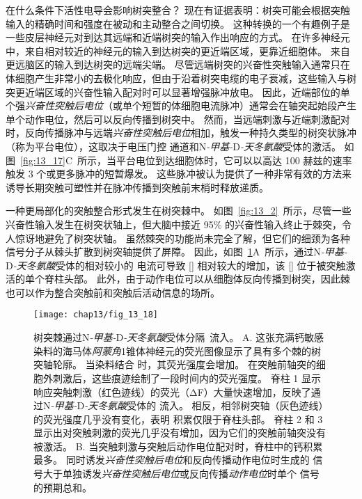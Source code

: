 在什么条件下活性电导会影响树突整合？
现在有证据表明：树突可能会根据突触输入的精确时间和强度在被动和主动整合之间切换。
这种转换的一个有趣例子是一些皮层神经元对到达其远端和近端树突的输入作出响应的方式。
在许多神经元中，来自相对较近的神经元的输入到达树突的更近端区域，更靠近细胞体。
来自更远脑区的输入到达树突的远端尖端。
尽管远端树突的兴奋性突触输入通常只在体细胞产生非常小的去极化响应，但由于沿着树突电缆的电子衰减，这些输入与树突更近端区域的兴奋性输入配对时可以显著增强脉冲放电。
因此，近端部位的单个强\textit{兴奋性突触后电位}（或单个短暂的体细胞电流脉冲）通常会在轴突起始段产生单个动作电位，然后可以反向传播到树突中。
然而，当远端刺激与近端刺激配对时，反向传播脉冲与远端\textit{兴奋性突触后电位}相加，触发一种持久类型的树突状脉冲（称为平台电位），这取决于电压门控  通道和N\textit{-甲基-}D\textit{-天冬氨酸}受体的激活。
如图~\ref{fig:13_17}C~所示，当平台电位到达细胞体时，它可以以高达 100 赫兹的速率触发 3 个或更多脉冲的短暂爆发。
这些脉冲被认为提供了一种非常有效的方法来诱导长期突触可塑性并在脉冲传播到突触前末梢时释放递质。


一种更局部化的突触整合形式发生在树突棘中。
如图~\ref{fig:13_2}~所示，尽管一些兴奋性输入发生在树突状轴上，但大脑中接近 95\% 的兴奋性输入终止于棘突，令人惊讶地避免了树突状轴。
虽然棘突的功能尚未完全了解，但它们的细颈为各种信号分子从棘头扩散到树突轴提供了屏障。
因此，如图~\ref{fig:13_18}A~所示，通过N\textit{-甲基-}D\textit{-天冬氨酸}受体的相对较小的  电流可导致 [] 相对较大的增加，该 [] 位于被突触激活的单个脊柱头部。
此外，由于动作电位可以从细胞体反向传播到树突，因此棘也可以作为整合突触前和突触后活动信息的场所。


\begin{figure}[htbp]
	\centering
	\texttt{[image: chap13/fig\_13\_18]}
	\caption{树突棘通过N\textit{-甲基-}D\textit{-天冬氨酸}受体分隔~流入。
		A. 这张充满钙敏感染料的海马体\textit{阿蒙角}1锥体神经元的荧光图像显示了具有多个棘的树突轴轮廓。
		当染料结合  时，其荧光强度会增加。
		在突触前轴突的细胞外刺激后，这些痕迹绘制了一段时间内的荧光强度。
		脊柱 1 显示响应突触刺激（红色迹线）的荧光（ΔF）大量快速增加，反映了通过N\textit{-甲基-}D\textit{-天冬氨酸}受体的  流入。
		相反，相邻树突轴（灰色迹线）的荧光强度几乎没有变化，表明  积累仅限于脊柱头部。
		脊柱 2 和 3 显示出对突触刺激的荧光几乎没有增加，因为它们的突触前轴突没有被激活\cite{lang2004transient}。 
		B. 当突触刺激与突触后动作电位配对时，脊柱中的钙积累最多。
		同时诱发\textit{兴奋性突触后电位}和反向传播动作电位时生成的  信号大于单独诱发\textit{兴奋性突触后电位}或反向传播\textit{动作电位}时单个  信号的预期总和\cite{yuste1995dendritic}。}
	\label{fig:13_18}
\end{figure}


